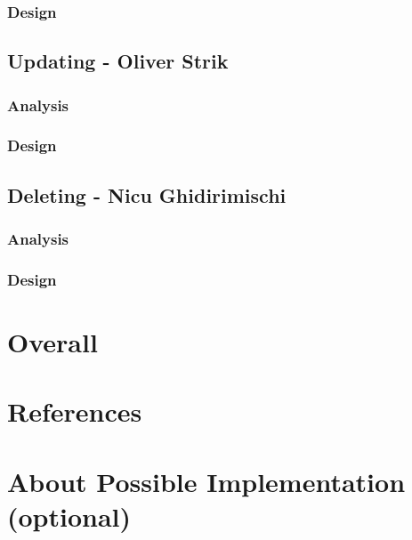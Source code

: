 \documentclass{article}
\begin{document}
\subsubsection*{Design}
\subsection*{Updating - Oliver Strik}
\subsubsection*{Analysis}
\subsubsection*{Design}
\subsection*{Deleting - Nicu Ghidirimischi}
\subsubsection*{Analysis}
\subsubsection*{Design}
\section*{Overall}
\section*{References}
\section*{About Possible Implementation (optional)}


\end{document}
